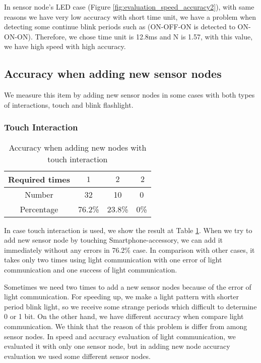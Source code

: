 In sensor node's LED case (Figure \ref{fig:evaluation_speed_accuracy2}), with same reasons we have very low accuracy with short time unit, we have a problem when detecting some continue blink periods such as (ON-OFF-ON is detected to ON-ON-ON). Therefore, we chose time unit is 12.8ms and N is 1.57, with this value, we have high speed with high accuracy.

\subsection{Accuracy when adding new sensor nodes}

We measure this item by adding new sensor nodes in some cases with both types of interactions, touch and blink flashlight.

\subsubsection{Touch Interaction}

\begin{table}[htdp]
\caption{Accuracy when adding new nodes with touch interaction}
\begin{center}
\begin{tabular}{|c|c|c|c|}
\hline
Required times&$1$&$2$&$\>2$\\
\hline
Number&32&10&0\\
\hline
Percentage&76.2\%&23.8\%&0\%\\
\hline
\end{tabular}
\end{center}
\label{table:evaluation_new_sensor_led}
\end{table}%

In case touch interaction is used, we show the result at Table \ref{table:evaluation_new_sensor_led}. When we try to add new sensor node by touching Smartphone-accessory, we can add it immediately without any errors in 76.2\% case. In comparison with other cases, it takes only two times using light communication with one error of light communication and one success of light communication.

Sometimes we need two times to add a new sensor nodes because of the error of light communication. For speeding up, we make a light pattern with shorter period blink light, so we receive some strange periods which difficult to determine 0 or 1 bit. On the other hand, we have different accuracy when compare light communication. We think that the reason of this problem is differ from among sensor nodes. In speed and accuracy evaluation of light communication, we evaluated it with only one sensor node, but in adding new node accuracy evaluation we used some different sensor nodes.


